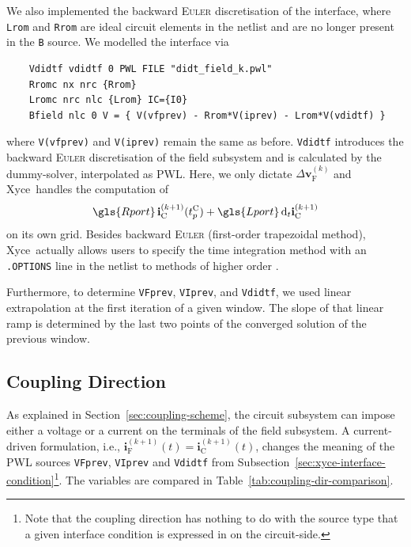We also implemented the  backward \textsc{Euler} discretisation of the interface, where \lstinline|Lrom| and \lstinline|Rrom| are ideal circuit elements in the netlist and are no longer present in the \lstinline|B| source. We modelled the interface via
\begin{lstlisting}
    Vdidtf vdidtf 0 PWL FILE "didt_field_k.pwl"
    Rromc nx nrc {Rrom}
    Lromc nrc nlc {Lrom} IC={I0}
    Bfield nlc 0 V = { V(vfprev) - Rrom*V(iprev) - Lrom*V(vdidtf) }
\end{lstlisting}
where \lstinline|V(vfprev)| and \lstinline|V(iprev)| remain the same as before. \lstinline|Vdidtf| introduces the backward \textsc{Euler} discretisation of the field subsystem and is calculated by the dummy-solver, interpolated as PWL. Here, we only dictate $\Delta \mathbf{v}_{\text{F}}^{(k)}$ and Xyce\texttrademark \ handles the computation of
\begin{equation*}
    \gls{Rport} \, \mathbf{i}_{\text{C}}^{(k+1)}(t_{p}^{\text{C}}) + \gls{Lport} \, \textrm{d}_{t} \mathbf{i}_{\text{C}}^{(k+1)}
\end{equation*}
on its own grid. Besides backward \textsc{Euler} (first-order trapezoidal method), Xyce\texttrademark \ actually allows users to specify the time integration method with an \lstinline|.OPTIONS| line in the netlist to methods of higher order \cite{Keiter2025UG}.

Furthermore, to determine \lstinline|VFprev|, \lstinline|VIprev|, and \lstinline|Vdidtf|, we used linear extrapolation at the first iteration of a given window. The slope of that linear ramp is determined by the last two points of the converged solution of the previous window.

\subsection{Coupling Direction} \label{sec:xyce-coupling-direction}
As explained in Section~\ref{sec:coupling-scheme}, the circuit subsystem can impose either a voltage or a current on the terminals of the field subsystem. A current-driven formulation, i.e., $\mathbf{i}_{\text{F}}^{(k+1)}(t) = \mathbf{i}_{\text{C}}^{(k+1)}(t)$, changes the meaning of the PWL sources \lstinline|VFprev|, \lstinline|VIprev| and \lstinline|Vdidtf| from Subsection~\ref{sec:xyce-interface-condition}\footnote{Note that the coupling direction has nothing to do with the source type that a given interface condition is expressed in on the circuit-side.}. The variables are compared in Table~\ref{tab:coupling-dir-comparison}.

